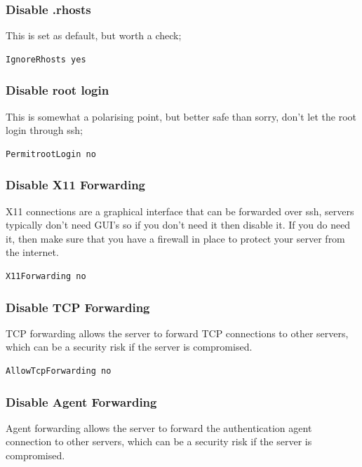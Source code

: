 \subsubsection{Disable .rhosts}

This is set as default, but worth a check;

\begin{verbatim}
IgnoreRhosts yes
\end{verbatim}

\subsubsection{Disable root login}

This is somewhat a polarising point, but better safe than sorry, don't let the root login through ssh;

\begin{verbatim}
PermitrootLogin no
\end{verbatim}

\subsubsection{Disable X11 Forwarding}

X11 connections are a graphical interface that can be forwarded over ssh, servers typically don't need GUI's so if you don't need it then disable it. 
If you do need it, then make sure that you have a firewall in place to protect your server from the internet. 

\begin{verbatim}
X11Forwarding no
\end{verbatim}

\subsubsection{Disable TCP Forwarding}

TCP forwarding allows the server to forward TCP connections to other servers, which can be a security risk if the server is compromised.

\begin{verbatim}
AllowTcpForwarding no
\end{verbatim}

\subsubsection{Disable Agent Forwarding}

Agent forwarding allows the server to forward the authentication agent connection to other servers, which can be a security risk if the server is compromised.

